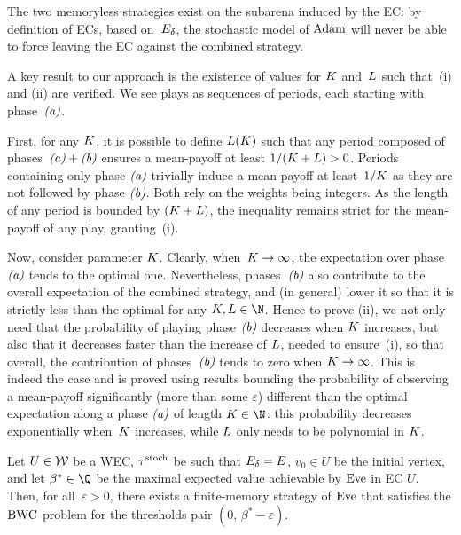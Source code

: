 The two memoryless strategies exist on the subarena induced by the EC: by definition of ECs, based on~$E_{\delta}$, the stochastic model of $\text{Adam}$ will never be able to force leaving the EC against the combined strategy.

A key result to our approach is the existence of values for $K$ and~$L$ such that~(i) and (ii) are verified. We see plays as sequences of periods, each starting with phase~$\textit{(a)}$.

First, for any $K$, it is possible to define $L(K)$ such that any period composed of phases~$\textit{(a)}+\textit{(b)}$ ensures a mean-payoff at least $1/(K+L) > 0$. Periods containing only phase $\textit{(a)}$ trivially induce a mean-payoff at least~$1/K$ as they are not followed by phase $\textit{(b)}$. Both rely on the weights being integers. As the length of any period is bounded by $(K+L)$, the inequality remains strict for the mean-payoff of any play, granting~(i).

Now, consider parameter $K$. Clearly, when~$K \rightarrow \infty$, the expectation over phase $\textit{(a)}$ tends to the optimal one. Nevertheless, phases~$\textit{(b)}$ also contribute to the overall expectation of the combined strategy, and (in general) lower it so that it is strictly less than the optimal for any $\stepsExp, \stepsWC \in \N$. Hence to prove (ii), we not only need that the probability of playing phase $\textit{(b)}$ decreases when $K$ increases, but also that it decreases faster than the increase of $L$, needed to ensure~(i), so that overall, the contribution of phases~$\textit{(b)}$ tends to zero when $K \rightarrow \infty$. This is indeed the case and is proved using results bounding the probability of observing a mean-payoff significantly (more than some $\varepsilon$) different than the optimal expectation along a phase $\textit{(a)}$ of length $\stepsExp \in \N$: this probability decreases exponentially when~$K$ increases, while $L$ only needs to be polynomial in $K$.

\begin{theorem}
\label{13-thm:insideWinning}
Let $U \in \mathcal{W}$ be a WEC, $\tau^{\text{stoch}} $ be such that $E_{\delta} = E$, $v_0 \in U$ be the initial vertex, and let $\beta^\ast \in \Q$ be the maximal expected value achievable by $\text{Eve}$ in EC $U$. Then, for all~$\varepsilon > 0$, there exists a finite-memory strategy of $\text{Eve}$ that satisfies the $\text{BWC}$ problem for the thresholds pair $(0,\, \beta^\ast - \varepsilon)$.
\end{theorem}

